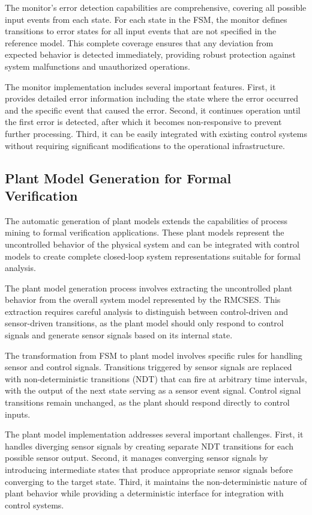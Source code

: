 The monitor's error detection capabilities are comprehensive, covering all possible input events from each state. For each state in the FSM, the monitor defines transitions to error states for all input events that are not specified in the reference model. This complete coverage ensures that any deviation from expected behavior is detected immediately, providing robust protection against system malfunctions and unauthorized operations.

The monitor implementation includes several important features. First, it provides detailed error information including the state where the error occurred and the specific event that caused the error. Second, it continues operation until the first error is detected, after which it becomes non-responsive to prevent further processing. Third, it can be easily integrated with existing control systems without requiring significant modifications to the operational infrastructure.

\subsection{Plant Model Generation for Formal Verification}

The automatic generation of plant models extends the capabilities of process mining to formal verification applications. These plant models represent the uncontrolled behavior of the physical system and can be integrated with control models to create complete closed-loop system representations suitable for formal analysis.

The plant model generation process involves extracting the uncontrolled plant behavior from the overall system model represented by the RMCSES. This extraction requires careful analysis to distinguish between control-driven and sensor-driven transitions, as the plant model should only respond to control signals and generate sensor signals based on its internal state.

The transformation from FSM to plant model involves specific rules for handling sensor and control signals. Transitions triggered by sensor signals are replaced with non-deterministic transitions (NDT) that can fire at arbitrary time intervals, with the output of the next state serving as a sensor event signal. Control signal transitions remain unchanged, as the plant should respond directly to control inputs.

The plant model implementation addresses several important challenges. First, it handles diverging sensor signals by creating separate NDT transitions for each possible sensor output. Second, it manages converging sensor signals by introducing intermediate states that produce appropriate sensor signals before converging to the target state. Third, it maintains the non-deterministic nature of plant behavior while providing a deterministic interface for integration with control systems.

